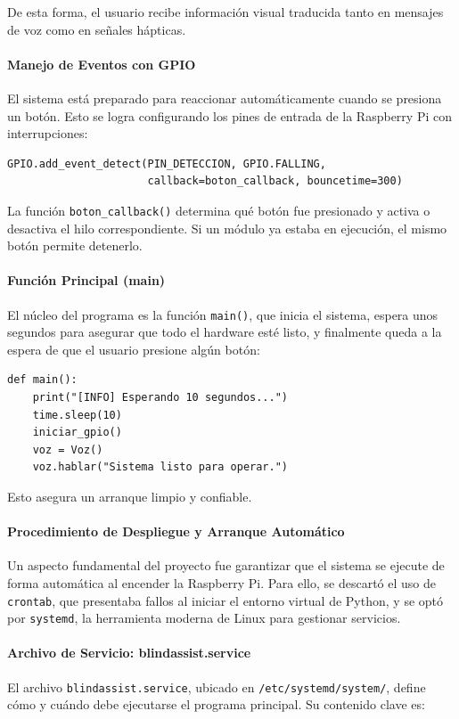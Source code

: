 \documentclass[12pt,a4paper]{article}
\begin{document}
De esta forma, el usuario recibe información visual traducida tanto en mensajes de voz como en señales hápticas.

\paragraph{Manejo de Eventos con GPIO}
El sistema está preparado para reaccionar automáticamente cuando se presiona un botón. Esto se logra configurando los pines de entrada de la Raspberry Pi con interrupciones:

\begin{verbatim}
GPIO.add_event_detect(PIN_DETECCION, GPIO.FALLING, 
                      callback=boton_callback, bouncetime=300)
\end{verbatim}

La función \texttt{boton\_callback()} determina qué botón fue presionado y activa o desactiva el hilo correspondiente. Si un módulo ya estaba en ejecución, el mismo botón permite detenerlo.

\paragraph{Función Principal (main)}
El núcleo del programa es la función \texttt{main()}, que inicia el sistema, espera unos segundos para asegurar que todo el hardware esté listo, y finalmente queda a la espera de que el usuario presione algún botón:

\begin{verbatim}
def main():
    print("[INFO] Esperando 10 segundos...")
    time.sleep(10)
    iniciar_gpio()
    voz = Voz()
    voz.hablar("Sistema listo para operar.")
\end{verbatim}

Esto asegura un arranque limpio y confiable.

\paragraph{Procedimiento de Despliegue y Arranque Automático}

Un aspecto fundamental del proyecto fue garantizar que el sistema se ejecute de forma automática al encender la Raspberry Pi. Para ello, se descartó el uso de \texttt{crontab}, que presentaba fallos al iniciar el entorno virtual de Python, y se optó por \texttt{systemd}, la herramienta moderna de Linux para gestionar servicios.

\paragraph{Archivo de Servicio: blindassist.service}
El archivo \texttt{blindassist.service}, ubicado en \texttt{/etc/systemd/system/}, define cómo y cuándo debe ejecutarse el programa principal. Su contenido clave es:
\end{document}
